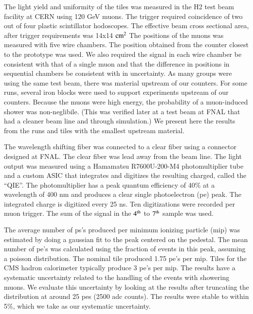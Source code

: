 \documentclass[review]{elsarticle}
\begin{document}
The light yield and uniformity of the tiles was measured in the H2 test beam facility at CERN using 120 GeV muons.  The trigger required coincidence of two out of four plastic scintillator hodoscopes. The effective beam cross sectional area, after trigger requirements was 14x14 ${\rm cm^2}$ The positions of the muons was measured with five wire chambers. The position obtained from the counter closest to the
prototype was used.  We also required the signal in each wire chamber be consistent with that of a single muon and that the difference in positions in sequential chambers be consistent with in uncertainty.
As many groups were using the same test beam, there was material upstream of our counters.  For some runs, several iron blocks were used to support experiments upstream of our counters.  Because the muons were high energy, the probability of a muon-induced shower was non-neglibile.  (This was verified later at a test beam at FNAL that had a cleaner beam line and through simulation.)  We present here the results
from the runs and tiles with the smallest upstream material.


The wavelength shifting fiber was connected to a clear fiber using a connector designed at FNAL.  The clear fiber was lead away from the beam line.
The light output was measured using a Hamamatsu R7600U-200-M4 photomultiplier tube and a custom ASIC that integrates and digitizes the resulting charged, called the ``QIE''\cite{qie}.  The photomultiplier has a peak quantum efficiency of 40\% at a wavelength of 400 nm and produces a clear single photoelectron (pe) peak.
The integrated charge is digitized every 25 ns.  Ten digitizations were recorded per muon trigger.  The sum of the signal in the ${\rm 4^{th}}$ to ${\rm 7^{th}}$ sample was used.


The average number of ps's produced per minimum ionizing particle (mip) was estimated by doing a gaussian fit to the peak centered on the pedestal.  The mean number of pe's was calculated using the fraction of events in this peak, assuming a poisson distribution.  The nominal tile produced 1.75 pe's per mip.
Tiles for the CMS hadron calorimeter typically produce 3 pe's per mip\cite{CMSHB}.
The results have a systematic uncertainty related to the handling of the events with showering muons.  We evaluate this uncertainty by looking at the results after truncating the distribution at around 25 pes (2500 adc counts).  The results were stable to within 5\%, which we take as our systematic uncertainty.
\end{document}
